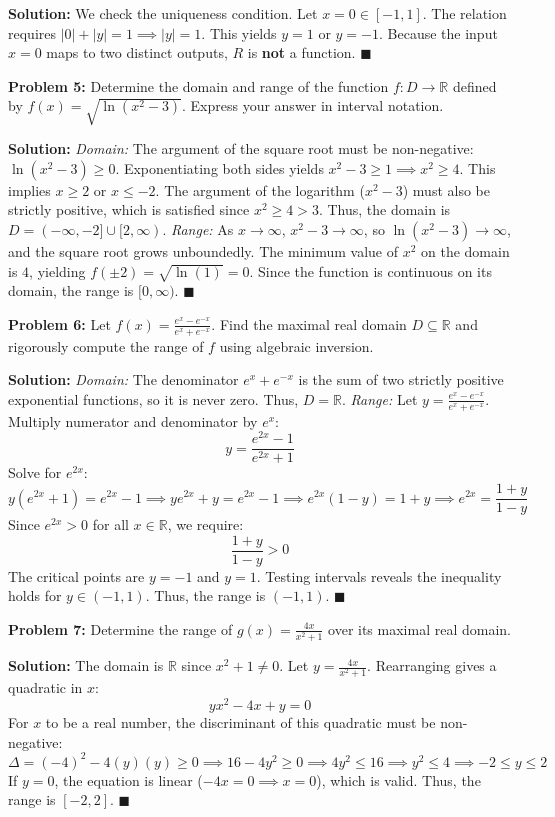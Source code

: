 \documentclass[11pt, letterpaper]{article}
\theoremstyle{definition}
\theoremstyle{remark}
\newcommand{\R}{\mathbb{R}}
\begin{document}
\textbf{Solution:}
We check the uniqueness condition. Let $x = 0 \in [-1, 1]$. The relation requires $|0| + |y| = 1 \implies |y| = 1$. This yields $y = 1$ or $y = -1$. Because the input $x = 0$ maps to two distinct outputs, $R$ is \textbf{not} a function. \hfill $\blacksquare$

\vspace{1em}
\textbf{Problem 5:} Determine the domain and range of the function $f: D \to \R$ defined by $f(x) = \sqrt{\ln(x^2 - 3)}$. Express your answer in interval notation.

\textbf{Solution:}
\textit{Domain:} The argument of the square root must be non-negative: $\ln(x^2 - 3) \ge 0$. Exponentiating both sides yields $x^2 - 3 \ge 1 \implies x^2 \ge 4$. This implies $x \ge 2$ or $x \le -2$. The argument of the logarithm ($x^2 - 3$) must also be strictly positive, which is satisfied since $x^2 \ge 4 > 3$. Thus, the domain is $D = (-\infty, -2] \cup [2, \infty)$.
\textit{Range:} As $x \to \infty$, $x^2 - 3 \to \infty$, so $\ln(x^2 - 3) \to \infty$, and the square root grows unboundedly. The minimum value of $x^2$ on the domain is $4$, yielding $f(\pm 2) = \sqrt{\ln(1)} = 0$. Since the function is continuous on its domain, the range is $[0, \infty)$. \hfill $\blacksquare$

\vspace{1em}
\textbf{Problem 6:} Let $f(x) = \frac{e^x - e^{-x}}{e^x + e^{-x}}$. Find the maximal real domain $D \subseteq \R$ and rigorously compute the range of $f$ using algebraic inversion.

\textbf{Solution:}
\textit{Domain:} The denominator $e^x + e^{-x}$ is the sum of two strictly positive exponential functions, so it is never zero. Thus, $D = \R$.
\textit{Range:} Let $y = \frac{e^x - e^{-x}}{e^x + e^{-x}}$. Multiply numerator and denominator by $e^x$:
\[ y = \frac{e^{2x} - 1}{e^{2x} + 1} \]
Solve for $e^{2x}$:
\[ y(e^{2x} + 1) = e^{2x} - 1 \implies ye^{2x} + y = e^{2x} - 1 \implies e^{2x}(1 - y) = 1 + y \implies e^{2x} = \frac{1 + y}{1 - y} \]
Since $e^{2x} > 0$ for all $x \in \R$, we require:
\[ \frac{1 + y}{1 - y} > 0 \]
The critical points are $y = -1$ and $y = 1$. Testing intervals reveals the inequality holds for $y \in (-1, 1)$. Thus, the range is $(-1, 1)$. \hfill $\blacksquare$

\vspace{1em}
\textbf{Problem 7:} Determine the range of $g(x) = \frac{4x}{x^2 + 1}$ over its maximal real domain.

\textbf{Solution:}
The domain is $\R$ since $x^2 + 1 \neq 0$. Let $y = \frac{4x}{x^2 + 1}$. Rearranging gives a quadratic in $x$:
\[ yx^2 - 4x + y = 0 \]
For $x$ to be a real number, the discriminant of this quadratic must be non-negative:
\[ \Delta = (-4)^2 - 4(y)(y) \ge 0 \implies 16 - 4y^2 \ge 0 \implies 4y^2 \le 16 \implies y^2 \le 4 \implies -2 \le y \le 2 \]
If $y = 0$, the equation is linear ($-4x = 0 \implies x = 0$), which is valid. Thus, the range is $[-2, 2]$. \hfill $\blacksquare$
\end{document}
